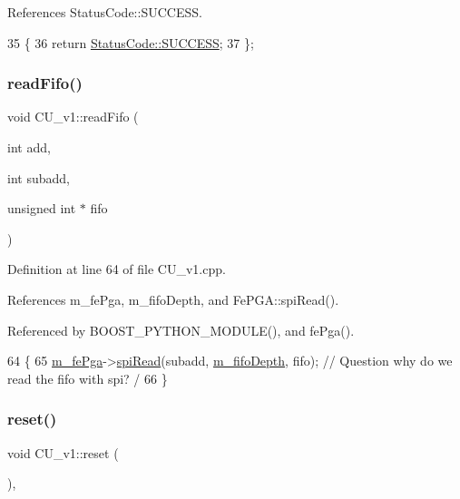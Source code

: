 References Status\+Code\+::\+S\+U\+C\+C\+E\+SS.


\begin{DoxyCode}
35                     \{
36     \textcolor{keywordflow}{return} \hyperlink{classStatusCode_a6f565cbeadc76d14c72f047e5e85eb4badd0da38d3ba0d922efd1f4619bc37ad8}{StatusCode::SUCCESS};
37   \};
\end{DoxyCode}
\mbox{\label{classCU__v1_ab57452edfcad0fa9efb23f8e4c532602}} 
\subsubsection{\texorpdfstring{read\+Fifo()}{readFifo()}}
{\footnotesize\ttfamily void C\+U\+\_\+v1\+::read\+Fifo (\begin{DoxyParamCaption}\item[{int}]{add,  }\item[{int}]{subadd,  }\item[{unsigned int $\ast$}]{fifo }\end{DoxyParamCaption})}



Definition at line 64 of file C\+U\+\_\+v1.\+cpp.



References m\+\_\+fe\+Pga, m\+\_\+fifo\+Depth, and Fe\+P\+G\+A\+::spi\+Read().



Referenced by B\+O\+O\+S\+T\+\_\+\+P\+Y\+T\+H\+O\+N\+\_\+\+M\+O\+D\+U\+L\+E(), and fe\+Pga().


\begin{DoxyCode}
64                                                              \{
65 \hyperlink{classCU__v1_a1b96b95e89dbe383877b34f9b517d910}{m\_fePga}->\hyperlink{classFePGA_a637b93fed75b576a54e723acb36cb6a3}{spiRead}(subadd, \hyperlink{classCU__v1_abc59a6644473bc4fdccc24e2a0c9d6ae}{m\_fifoDepth}, fifo); \textcolor{comment}{// Question why do we read the fifo
       with spi? /}
66 \}
\end{DoxyCode}
\mbox{\label{classCU__v1_add509ddd31f1a0c4d68b889ba6edfdb3}} 
\subsubsection{\texorpdfstring{reset()}{reset()}}
{\footnotesize\ttfamily void C\+U\+\_\+v1\+::reset (\begin{DoxyParamCaption}{ }\end{DoxyParamCaption})\hspace{0.3cm}{\ttfamily [inline]}, {\ttfamily [virtual]}}

